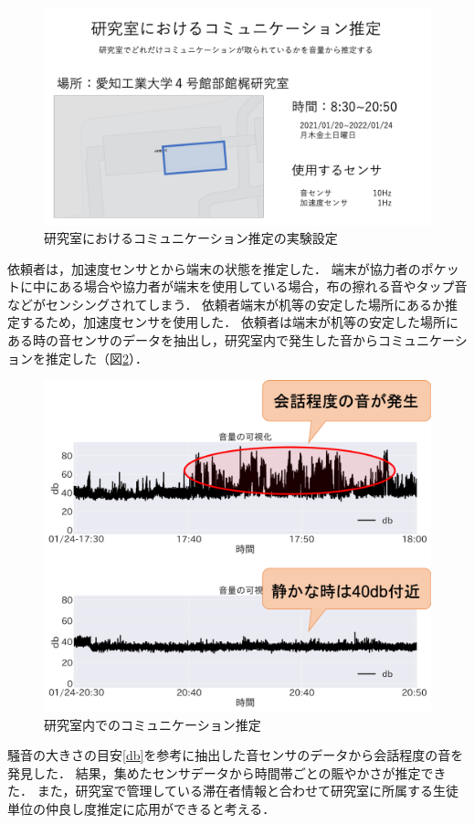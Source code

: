 \begin{figure}[tbh]
    \centering
    \includegraphics[width=16cm]{img_ex_case_2.png}
    \caption{研究室におけるコミュニケーション推定の実験設定}
    \label{fig:ex_case_2}
\end{figure}

依頼者は，加速度センサとから端末の状態を推定した．
端末が協力者のポケットに中にある場合や協力者が端末を使用している場合，布の擦れる音やタップ音などがセンシングされてしまう．
依頼者端末が机等の安定した場所にあるか推定するため，加速度センサを使用した．
依頼者は端末が机等の安定した場所にある時の音センサのデータを抽出し，研究室内で発生した音からコミュニケーションを推定した（図\ref{fig:ex_case_2_audio}）．

\begin{figure}[tbh]
    \centering
    \includegraphics[width=16cm]{img_ex_case_2_audio.png}
    \caption{研究室内でのコミュニケーション推定}
    \label{fig:ex_case_2_audio}
\end{figure}

騒音の大きさの目安\ref{db}を参考に抽出した音センサのデータから会話程度の音を発見した．
結果，集めたセンサデータから時間帯ごとの賑やかさが推定できた．
また，研究室で管理している滞在者情報と合わせて研究室に所属する生徒単位の仲良し度推定に応用ができると考える．


